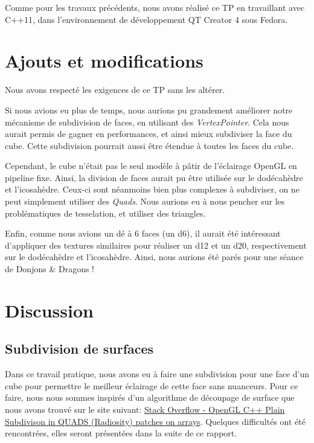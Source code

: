 \documentclass[10pt,a4paper]{article}
\begin{document}
Comme pour les travaux précédents, nous avons réalisé ce TP en travaillant avec C++11, dans l'environnement de développement QT Creator 4 sous Fedora.

\section{Ajouts et modifications}

Nous avons respecté les exigences de ce TP sans les altérer.

Si nous avions eu plus de temps, nous aurions pu grandement améliorer notre mécanisme de subdivision de faces, en utilisant des \textit{VertexPointer}. Cela nous aurait permis de gagner en performances, et ainsi mieux subdiviser la face du cube. Cette subdivision pourrait aussi être étendue à toutes les faces du cube.

Cependant, le cube n'était pas le seul modèle à pâtir de l'éclairage OpenGL en pipeline fixe. Ainsi, la division de faces aurait pu être utilisée sur le dodécahèdre et l'icosahèdre. Ceux-ci sont néanmoins bien plus complexes à subdiviser, on ne peut simplement utiliser des \textit{Quads}. Nous aurions eu à nous pencher sur les problématiques de tesselation, et utiliser des triangles.

Enfin, comme nous avions un dé à 6 faces (un d6), il aurait été intéressant d'appliquer des textures similaires pour réaliser un d12 et un d20, respectivement sur le dodécahèdre et l'icosahèdre. Ainsi, nous aurions été parés pour une séance de Donjons \& Dragons !

\section{Discussion}

\subsection{Subdivision de surfaces}

Dans ce travail pratique, nous avons eu à faire une subdivision pour une face d'un cube pour permettre le meilleur éclairage de cette face sans nuanceurs. Pour ce faire, nous nous sommes inspirés d'un algorithme de découpage de surface que nous avons trouvé sur le site suivant:  \href{http://stackoverflow.com/questions/19780788/opengl-c-plain-subdivison-in-quads-radiosity-patches-on-arrays}{Stack Overflow - OpenGL C++ Plain Subdivison in QUADS (Radiosity) patches on arrays}. Quelques difficultés ont été rencontrées, elles seront présentées dans la suite de ce rapport.
\end{document}
